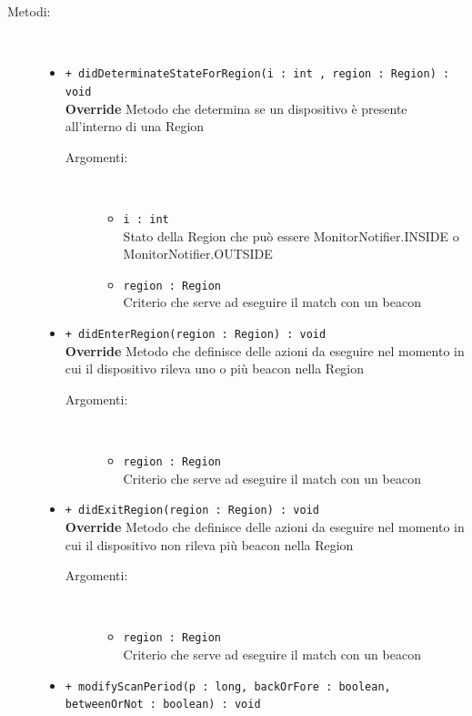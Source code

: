 \documentclass[../DefinizioneDiProdotto.tex]{subfiles}
\begin{document}
\begin{description}
\begin{itemize}
\end{itemize}
\item[Metodi:] \
\begin{itemize}
\item \texttt{+ didDeterminateStateForRegion(i : int , region : Region) : void}\\
\textbf{Override} Metodo che determina se un dispositivo è presente all'interno di una Region
 \begin{description}
\item[Argomenti:] \
\begin{itemize}
\item \texttt{i : int }\\
Stato della Region che può essere MonitorNotifier.INSIDE o MonitorNotifier.OUTSIDE\item \texttt{region : Region}\\
Criterio che serve ad eseguire il match con un beacon\end{itemize}
\end{description}
\item \texttt{+ didEnterRegion(region : Region) : void}\\
\textbf{Override} Metodo che definisce delle azioni da eseguire nel momento in cui il dispositivo rileva uno o più beacon nella Region
 \begin{description}
\item[Argomenti:] \
\begin{itemize}
\item \texttt{region : Region}\\
Criterio che serve ad eseguire il match con un beacon\end{itemize}
\end{description}
\item \texttt{+ didExitRegion(region : Region) : void}\\
\textbf{Override} Metodo che definisce delle azioni da eseguire nel momento in cui il dispositivo non rileva più beacon nella Region
 \begin{description}
\item[Argomenti:] \
\begin{itemize}
\item \texttt{region : Region}\\
Criterio che serve ad eseguire il match con un beacon\end{itemize}
\end{description}
\item \texttt{+ modifyScanPeriod(p : long, backOrFore : boolean, betweenOrNot : boolean) : void}\\

\end{itemize}
\end{description}
\end{document}
